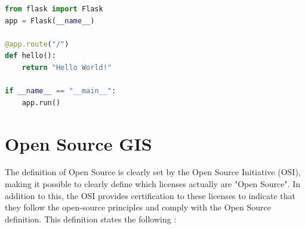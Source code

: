 \begin{lstlisting}[language=Python]
from flask import Flask
app = Flask(__name__)

@app.route("/")
def hello():
    return "Hello World!"

if __name__ == "__main__":
    app.run()
\end{lstlisting} 


\section{Open Source GIS}

The definition of Open Source is clearly set by the Open Source Initiative (OSI), making it possible to clearly define which licenses actually are "Open Source". In addition to this, the OSI provides certification to these licenses to indicate that they follow the open-source principles and comply with the Open Source definition. This definition states the following \citep{osbook}:
